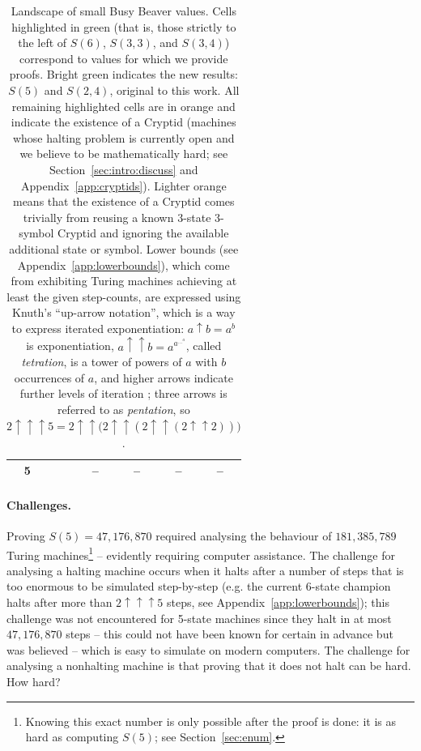 \documentclass[a4paper,british]{article}
\theoremstyle{definition} %
\numberwithin{equation}{section}
\theoremstyle{definition} %
\newcommand{\BBtheFifth}{47{,}176{,}870}
\newcommand{\BBtheFifthTNF}{181{,}385{,}789}
\begin{document}
\begin{table}[h]
\begin{tabular}{c|ccccc}
        \hline
        5                & \cellcolor{orange!50}{$S(2,5) > 10 \uparrow \uparrow 4$}
                         & --                                                             & --               & --               & --                                  \\
        \hline
    \end{tabular}
    \caption{Landscape of small Busy Beaver values.
        Cells highlighted in green (that is, those strictly to the left of $S(6)$, $S(3,3)$, and $S(3,4)$) correspond to values for which we provide \Coq proofs. Bright green indicates the new results: $S(5)$ and $S(2,4)$, original to this work.
        All remaining highlighted cells are in orange and indicate the existence of a Cryptid (\ie machines whose halting problem is currently open and we believe to be mathematically hard; see Section~\ref{sec:intro:discuss} and Appendix~\ref{app:cryptids}). Lighter orange means that the existence of a Cryptid comes trivially from reusing a known 3-state 3-symbol Cryptid and ignoring the available additional state or symbol. Lower bounds (see Appendix~\ref{app:lowerbounds}), which come from exhibiting Turing machines achieving at least the given step-counts, are expressed using Knuth's ``up-arrow notation'', which is a way to express iterated exponentiation:
        $a \uparrow b = a^b$ is exponentiation,
        $a \uparrow\uparrow b = a^{a^{\dots^a}}$, called \textit{tetration}, is a tower of powers of $a$ with $b$ occurrences of $a$,
        and higher arrows indicate further levels of iteration \cite{Knuth1976Coping}; \eg three arrows is referred to as \textit{pentation}, so $2 \uparrow \uparrow \uparrow 5 = 2 \uparrow\uparrow \bigl( 2 \uparrow\uparrow ( 2 \uparrow\uparrow ( 2 \uparrow\uparrow 2 ) ) \bigr)$.
    }
    \label{table:landscape}
\end{table}

\vspace{-2ex}
\paragraph{Challenges.} Proving $S(5) = \BBtheFifth$ required analysing the behaviour of $\BBtheFifthTNF$ Turing machines\footnote{Knowing this exact number is only possible after the proof is done: it is as hard as computing $S(5)$; see Section~\ref{sec:enum}.} -- evidently requiring computer assistance. The challenge for analysing a halting machine occurs when it halts after a number of steps that is too enormous to be simulated step-by-step (e.g. the current 6-state champion halts after more than $2 \uparrow \uparrow \uparrow 5$ steps, see Appendix~\ref{app:lowerbounds}); this challenge was not encountered for 5-state machines since they halt in at most $\BBtheFifth$ steps -- this could not have been known for certain in advance but was believed -- which is easy to simulate on modern computers. The challenge for analysing a nonhalting machine is that proving that it does not halt can be hard. How hard?
\end{document}
